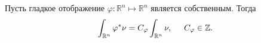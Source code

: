 \begin{to_tas}
    \label{task_6.108}
    Пусть гладкое отображение $\varphi \colon \mathbb{R}^n \mapsto \mathbb{R}^n$ является собственным. Тогда
    \begin{equation*}
        \int_{\mathbb{R}^n}\varphi^* \nu = C_\varphi \int_{\mathbb{R}^n} \nu, \hspace{0.5cm} 
        C_\varphi \in \mathbb{Z}.
    \end{equation*}
\end{to_tas}
